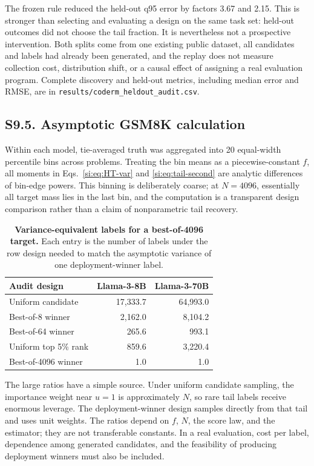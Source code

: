 \documentclass[10pt,twocolumn]{article}
\begin{document}
The frozen rule reduced the held-out q95 error by factors 3.67 and 2.15. This is stronger than selecting and evaluating a design on the same task set: held-out outcomes did not choose the tail fraction. It is nevertheless not a prospective intervention. Both splits come from one existing public dataset, all candidates and labels had already been generated, and the replay does not measure collection cost, distribution shift, or a causal effect of assigning a real evaluation program. Complete discovery and held-out metrics, including median error and RMSE, are in \texttt{results/coderm\_heldout\_audit.csv}.

\subsection*{S9.5. Asymptotic GSM8K calculation}

Within each model, tie-averaged truth was aggregated into 20 equal-width percentile bins across problems. Treating the bin means as a piecewise-constant $f$, all moments in Eqs.~\ref{si:eq:HT-var} and \ref{si:eq:tail-second} are analytic differences of bin-edge powers. This binning is deliberately coarse; at $N=4096$, essentially all target mass lies in the last bin, and the computation is a transparent design comparison rather than a claim of nonparametric tail recovery.

\begin{table}[h]
\centering
\caption{\textbf{Variance-equivalent labels for a best-of-4096 target.} Each entry is the number of labels under the row design needed to match the asymptotic variance of one deployment-winner label.}
\label{si:tab:efficiency}
\begin{tabular}{lrr}
\toprule
Audit design & Llama-3-8B & Llama-3-70B \\
\midrule
Uniform candidate & 17,333.7 & 64,993.0 \\
Best-of-8 winner & 2,162.0 & 8,104.2 \\
Best-of-64 winner & 265.6 & 993.1 \\
Uniform top 5\% rank & 859.6 & 3,220.4 \\
Best-of-4096 winner & 1.0 & 1.0 \\
\bottomrule
\end{tabular}
\end{table}

The large ratios have a simple source. Under uniform candidate sampling, the importance weight near $u=1$ is approximately $N$, so rare tail labels receive enormous leverage. The deployment-winner design samples directly from that tail and uses unit weights. The ratios depend on $f$, $N$, the score law, and the estimator; they are not transferable constants. In a real evaluation, cost per label, dependence among generated candidates, and the feasibility of producing deployment winners must also be included.
\end{document}
